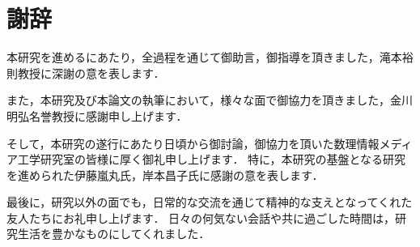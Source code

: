 
\chapter*{謝辞}

本研究を進めるにあたり，全過程を通じて御助言，御指導を頂きました，滝本裕則教授に深謝の意を表します．

また，本研究及び本論文の執筆において，様々な面で御協力を頂きました，金川明弘名誉教授に感謝申し上げます．

そして，本研究の遂行にあたり日頃から御討論，御協力を頂いた数理情報メディア工学研究室の皆様に厚く御礼申し上げます．
特に，本研究の基盤となる研究を進められた伊藤嵐丸氏，岸本昌子氏に感謝の意を表します．

最後に，研究以外の面でも，日常的な交流を通じて精神的な支えとなってくれた友人たちにお礼申し上げます．
日々の何気ない会話や共に過ごした時間は，研究生活を豊かなものにしてくれました．